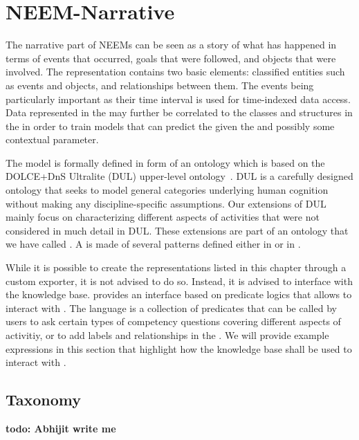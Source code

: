 \section{NEEM-Narrative}
\label{ch:narrative}

The narrative part of NEEMs can be seen as a story of what has happened in terms of events that occurred, goals that were followed, and objects that were involved.
The \neemnar representation contains two basic elements: classified entities such as events and objects, and relationships between them.
The events being particularly important as their time interval is used for time-indexed data access.
Data represented in the \neemexp may further be correlated to the classes and structures in the \neemnar in order to train models that can predict the \neemnar given the \neemexp and possibly some contextual parameter.

The \neemnar model is formally defined in form of an \owl ontology which is based on the DOLCE+DnS Ultralite (DUL) upper-level ontology~\cite{DOLCE2003}.
DUL is a carefully designed ontology that seeks to model general categories underlying human cognition without making any discipline-specific assumptions.
Our extensions of DUL mainly focus on characterizing different aspects of activities that were not considered in much detail in DUL.
These extensions are part of an ontology that we have called \soma.
A \neemnar is made of several patterns defined either in \dul or in \soma.

While it is possible to create the representations listed in this chapter through a custom exporter, it is not advised to do so.
Instead, it is advised to interface with the \knowrob knowledge base.
\knowrob provides an interface based on predicate logics that allows to interact with \neems.
The language is a collection of predicates that can be called by users to ask certain types of competency questions covering different aspects of activitiy, or to add labels and relationships in the \neemnar.
We will provide example expressions in this section that highlight how the knowledge base shall be used to interact with \neems.

\subsection{Taxonomy}
\label{sec:taxonomy}
\textbf{todo: Abhijit write me}

